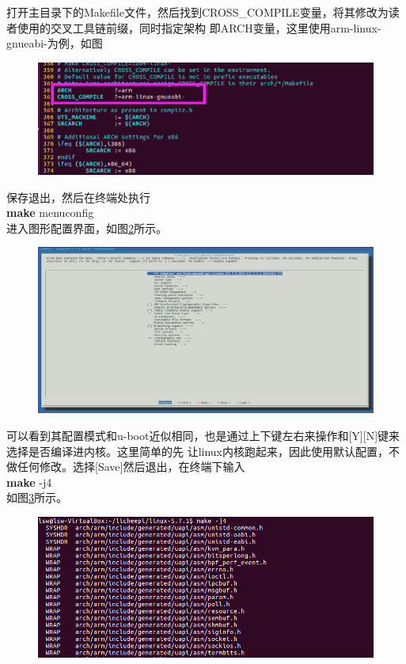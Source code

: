 打开主目录下的Makefile文件，然后找到CROSS\_COMPILE变量，将其修改为读者使用的交叉工具链前缀，同时指定架构
即ARCH变量，这里使用arm-linux-gnueabi-为例，如图
\begin{figure}[htbp]
	\centering
	\includegraphics[width=1\linewidth]{chapter2/img/linuxmakefile}
	\caption{}
	\label{fig:linuxmakefile}
\end{figure}
保存退出，然后在终端处执行\\
\textbf{make} menuconfig \\
进入图形配置界面，如图\ref{fig:linuxmenuconfig}所示。
\begin{figure}[htbp]
	\centering
	\includegraphics[width=1\linewidth]{chapter2/img/linuxmenuconfig}
	\caption{}
	\label{fig:linuxmenuconfig}
\end{figure}
可以看到其配置模式和u-boot近似相同，也是通过上下键左右来操作和[Y][N]键来选择是否编译进内核。这里简单的先
让linux内核跑起来，因此使用默认配置，不做任何修改。选择[Save]然后退出，在终端下输入\\
\textbf{make} -j4 \\
如图\ref{fig:linuxmakepng}所示。
\begin{figure}[htbp]
	\centering
	\includegraphics[width=1\linewidth]{chapter2/img/linuxmakepng}
	\caption{}
	\label{fig:linuxmakepng}
\end{figure}
